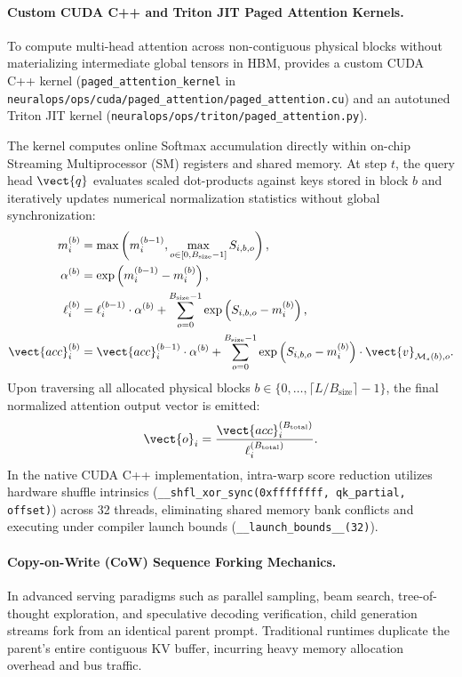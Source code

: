 \paragraph{Custom CUDA C++ and Triton JIT Paged Attention Kernels.}
To compute multi-head attention across non-contiguous physical blocks without materializing intermediate global tensors in HBM, \neuralops{} provides a custom CUDA C++ kernel (\texttt{paged\_attention\_kernel} in \texttt{neuralops/ops/cuda/paged\_attention/paged\_attention.cu}) and an autotuned Triton JIT kernel (\texttt{neuralops/ops/triton/paged\_attention.py}).

The kernel computes online Softmax accumulation directly within on-chip Streaming Multiprocessor (SM) registers and shared memory. At step $t$, the query head $\vect{q}$ evaluates scaled dot-products against keys stored in block $b$ and iteratively updates numerical normalization statistics without global synchronization:
\begin{align}
m_i^{(b)} &= \max\left(m_i^{(b-1)}, \max_{o \in [0, B_{\text{size}}-1]} S_{i, b, o}\right), \\
\alpha^{(b)} &= \exp\left(m_i^{(b-1)} - m_i^{(b)}\right), \\
\ell_i^{(b)} &= \ell_i^{(b-1)} \cdot \alpha^{(b)} + \sum_{o=0}^{B_{\text{size}}-1} \exp\left(S_{i, b, o} - m_i^{(b)}\right), \\
\vect{acc}_i^{(b)} &= \vect{acc}_i^{(b-1)} \cdot \alpha^{(b)} + \sum_{o=0}^{B_{\text{size}}-1} \exp\left(S_{i, b, o} - m_i^{(b)}\right) \cdot \vect{v}_{\mathcal{M}_s(b), o}.
\end{align}
Upon traversing all allocated physical blocks $b \in \{0, \dots, \lceil L / B_{\text{size}} \rceil - 1\}$, the final normalized attention output vector is emitted:
\begin{equation}
\vect{o}_i = \frac{\vect{acc}_i^{(B_{\text{total}})}}{\ell_i^{(B_{\text{total}})}}.
\end{equation}
In the native CUDA C++ implementation, intra-warp score reduction utilizes hardware shuffle intrinsics (\texttt{\_\_shfl\_xor\_sync(0xffffffff, qk\_partial, offset)}) across 32 threads, eliminating shared memory bank conflicts and executing under compiler launch bounds (\texttt{\_\_launch\_bounds\_\_(32)}).

\paragraph{Copy-on-Write (CoW) Sequence Forking Mechanics.}
In advanced serving paradigms such as parallel sampling, beam search, tree-of-thought exploration, and speculative decoding verification, child generation streams fork from an identical parent prompt. Traditional runtimes duplicate the parent's entire contiguous KV buffer, incurring heavy memory allocation overhead and bus traffic.

